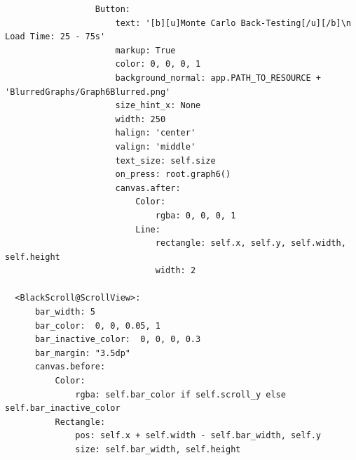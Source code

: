 \documentclass{article}
\begin{document}
\begin{verbatim}
                  Button:
                      text: '[b][u]Monte Carlo Back-Testing[/u][/b]\n Load Time: 25 - 75s'
                      markup: True
                      color: 0, 0, 0, 1
                      background_normal: app.PATH_TO_RESOURCE + 'BlurredGraphs/Graph6Blurred.png'
                      size_hint_x: None
                      width: 250
                      halign: 'center'
                      valign: 'middle'
                      text_size: self.size
                      on_press: root.graph6()
                      canvas.after:
                          Color:
                              rgba: 0, 0, 0, 1
                          Line:
                              rectangle: self.x, self.y, self.width, self.height
                              width: 2

  <BlackScroll@ScrollView>:
      bar_width: 5
      bar_color:  0, 0, 0.05, 1
      bar_inactive_color:  0, 0, 0, 0.3
      bar_margin: "3.5dp"
      canvas.before:
          Color:
              rgba: self.bar_color if self.scroll_y else self.bar_inactive_color
          Rectangle:
              pos: self.x + self.width - self.bar_width, self.y
              size: self.bar_width, self.height
\end{verbatim}
\vspace{0.5cm}
\end{document}
